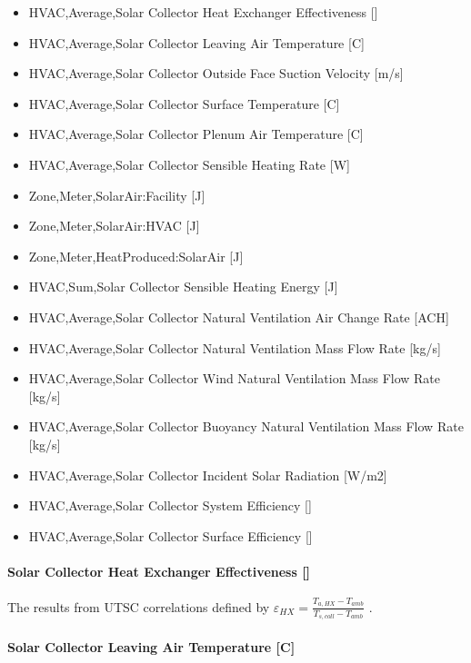 \begin{itemize}
\item
  HVAC,Average,Solar Collector Heat Exchanger Effectiveness {[]}
\item
  HVAC,Average,Solar Collector Leaving Air Temperature {[}C{]}
\item
  HVAC,Average,Solar Collector Outside Face Suction Velocity {[}m/s{]}
\item
  HVAC,Average,Solar Collector Surface Temperature {[}C{]}
\item
  HVAC,Average,Solar Collector Plenum Air Temperature {[}C{]}
\item
  HVAC,Average,Solar Collector Sensible Heating Rate {[}W{]}
\item
  Zone,Meter,SolarAir:Facility {[}J{]}
\item
  Zone,Meter,SolarAir:HVAC {[}J{]}
\item
  Zone,Meter,HeatProduced:SolarAir {[}J{]}
\item
  HVAC,Sum,Solar Collector Sensible Heating Energy {[}J{]}
\item
  HVAC,Average,Solar Collector Natural Ventilation Air Change Rate {[}ACH{]}
\item
  HVAC,Average,Solar Collector Natural Ventilation Mass Flow Rate {[}kg/s{]}
\item
  HVAC,Average,Solar Collector Wind Natural Ventilation Mass Flow Rate {[}kg/s{]}
\item
  HVAC,Average,Solar Collector Buoyancy Natural Ventilation Mass Flow Rate {[}kg/s{]}
\item
  HVAC,Average,Solar Collector Incident Solar Radiation {[}W/m2{]}
\item
  HVAC,Average,Solar Collector System Efficiency {[]}
\item
  HVAC,Average,Solar Collector Surface Efficiency {[]}
\end{itemize}

\paragraph{Solar Collector Heat Exchanger Effectiveness {[]}}\label{solar-collector-heat-exchanger-effectiveness}

The results from UTSC correlations defined by \({\varepsilon_{HX}} = \frac{{{T_{a,HX}} - {T_{amb}}}}{{{T_{s,coll}} - {T_{amb}}}}\) .

\paragraph{Solar Collector Leaving Air Temperature {[}C{]}}\label{solar-collector-leaving-air-temperature-c}

